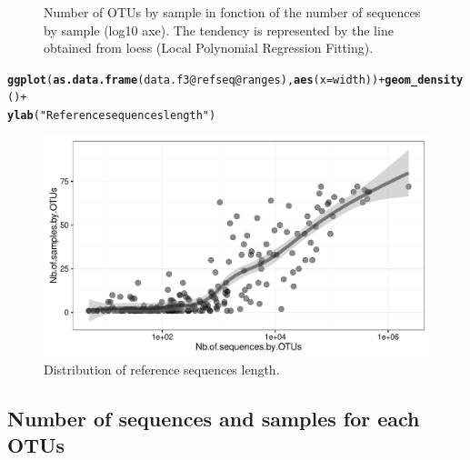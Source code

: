 \documentclass[12pt]{article}\usepackage[]{graphicx}\usepackage[]{color}
\makeatletter
\def\maxwidth{ %
  \ifdim\Gin@nat@width>\linewidth
    \linewidth
  \else
    \Gin@nat@width
  \fi
}
\newcommand{\hlstr}[1]{\textcolor[rgb]{0.192,0.494,0.8}{#1}}%
\newcommand{\hlopt}[1]{\textcolor[rgb]{0,0,0}{#1}}%
\newcommand{\hlstd}[1]{\textcolor[rgb]{0.345,0.345,0.345}{#1}}%
\newcommand{\hlkwc}[1]{\textcolor[rgb]{0.333,0.667,0.333}{#1}}%
\newcommand{\hlkwd}[1]{\textcolor[rgb]{0.737,0.353,0.396}{\textbf{#1}}}%
\newenvironment{kframe}{%
 \def\at@end@of@kframe{}%
 \ifinner\ifhmode%
  \def\at@end@of@kframe{\end{minipage}}%
  \begin{minipage}{\columnwidth}%
 \fi\fi%
 \def\FrameCommand##1{\hskip\@totalleftmargin \hskip-\fboxsep
 \colorbox{shadecolor}{##1}\hskip-\fboxsep
     \hskip-\linewidth \hskip-\@totalleftmargin \hskip\columnwidth}%
 \MakeFramed {\advance\hsize-\width
   \@totalleftmargin\z@ \linewidth\hsize
   \@setminipage}}%
 {\par\unskip\endMakeFramed%
 \at@end@of@kframe}
\newenvironment{knitrout}{}{} %
\numberwithin{figure}{section}
\makeatother
\begin{document}
\begin{knitrout}
\begin{figure}
{}

\caption[Number of OTUs by sample in fonction of the number of sequences by sample (log10 axe)]{Number of OTUs by sample in fonction of the number of sequences by sample (log10 axe). The tendency is represented by the line obtained from loess (Local Polynomial Regression Fitting).}\label{fig:unnamed-chunk-20}
\end{figure}


\end{knitrout}

\begin{knitrout}\small
{}\color{fgcolor}\begin{kframe}
\begin{alltt}
\hlkwd{ggplot}\hlstd{(}\hlkwd{as.data.frame}\hlstd{(data.f3}\hlopt{@}\hlkwc{refseq}\hlopt{@}\hlkwc{ranges}\hlstd{),} \hlkwd{aes}\hlstd{(}\hlkwc{x} \hlstd{= width))} \hlopt{+} \hlkwd{geom_density}\hlstd{()} \hlopt{+}
  \hlkwd{ylab}\hlstd{(}\hlstr{"Reference sequences length"}\hlstd{)}
\end{alltt}
\end{kframe}\begin{figure}

{\centering \includegraphics[width=\maxwidth]{figure/unnamed-chunk-21-1} 

}

\caption[Distribution of reference sequences length]{Distribution of reference sequences length.}\label{fig:unnamed-chunk-21}
\end{figure}


\end{knitrout}

  \subsection{Number of sequences and samples for each OTUs}
\end{document}
